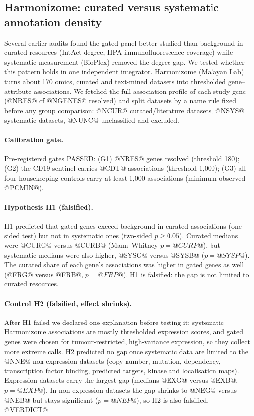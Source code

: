 \subsection{Harmonizome: curated versus systematic annotation density}
\label{sec:harmonizome}
Several earlier audits found the gated panel better studied than background
in curated resources (IntAct degree, HPA immunofluorescence coverage) while
systematic measurement (BioPlex) removed the degree gap. We tested whether
this pattern holds in one independent integrator. Harmonizome (Ma'ayan Lab)
turns about 170 omics, curated and text-mined datasets into thresholded
gene--attribute associations. We fetched the full association profile of
each study gene (@NRES@ of @NGENES@ resolved) and split datasets by a name
rule fixed before any group comparison: @NCUR@ curated/literature datasets,
@NSYS@ systematic datasets, @NUNC@ unclassified and excluded.

\paragraph{Calibration gate.} Pre-registered gates PASSED: (G1) @NRES@
genes resolved (threshold 180); (G2) the CD19 sentinel carries @CDT@
associations (threshold 1{,}000); (G3) all four housekeeping controls carry at
least 1{,}000 associations (minimum observed @PCMIN@).

\paragraph{Hypothesis H1 (falsified).} H1 predicted that gated genes exceed
background in curated associations (one-sided test) but not in systematic
ones (two-sided $p\ge 0.05$). Curated medians were @CURG@ versus @CURB@
(Mann--Whitney $p=@CURP@$), but systematic medians were also higher,
@SYSG@ versus @SYSB@ ($p=@SYSP@$). The curated share of each gene's
associations was higher in gated genes as well (@FRG@ versus @FRB@,
$p=@FRP@$). H1 is falsified: the gap is not limited to curated resources.

\paragraph{Control H2 (falsified, effect shrinks).} After H1 failed we
declared one explanation before testing it: systematic Harmonizome
associations are mostly thresholded expression scores, and gated genes
were chosen for tumour-restricted, high-variance expression, so they collect
more extreme calls.
H2 predicted no gap once systematic data are limited to the @NNE@
non-expression datasets (copy number, mutation, dependency, transcription
factor binding, predicted targets, kinase and localisation maps).
Expression datasets carry the largest gap (medians @EXG@ versus @EXB@,
$p=@EXP@$). In non-expression datasets the gap shrinks to @NEG@ versus
@NEB@ but stays significant ($p=@NEP@$), so H2 is also falsified.
@VERDICT@

